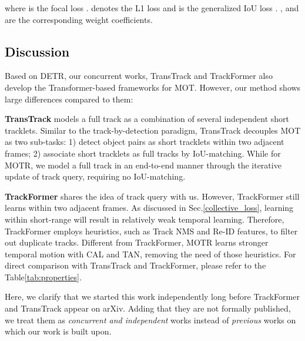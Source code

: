 \documentclass[runningheads]{llncs}
\begin{document}
where  is the focal loss \cite{lin2017focalloss}.  denotes the L1 loss and  is the generalized IoU loss \cite{rezatofighi2019giouloss}. ,   and  are the corresponding weight coefficients.


\subsection{Discussion}
\label{discussion}
Based on DETR, our concurrent works, TransTrack \cite{transtrack} and TrackFormer \cite{Meinhardt2021trackformer} also develop the Transformer-based frameworks for MOT. However, our method shows large differences compared to them:

\textbf{TransTrack} models a full track as a combination of several independent short tracklets.
Similar to the track-by-detection paradigm, TransTrack decouples MOT as two sub-tasks:
1) detect object pairs as short tracklets within two adjacent frames;
2) associate short tracklets as full tracks by IoU-matching.
While for MOTR, we model a full track in an end-to-end manner through the iterative update of track query, requiring no IoU-matching.

\textbf{TrackFormer} shares the idea of track query with us.
However, TrackFormer still learns within two adjacent frames.
As discussed in Sec.\;\ref{collective_loss}, learning within short-range will result in relatively weak temporal learning.
Therefore, TrackFormer employs heuristics, such as Track NMS and Re-ID features, to filter out duplicate tracks.
Different from TrackFormer, MOTR learns stronger temporal motion with CAL and TAN, removing the need of those heuristics.
For direct comparison with TransTrack and TrackFormer, please refer to the Table\;\ref{tab:properties}.

Here, we clarify that we started this work independently long before TrackFormer and TransTrack appear on arXiv.
Adding that they are not formally published, we treat them as \emph{concurrent and independent} works instead of \emph{previous} works on which our work is built upon.
\end{document}
